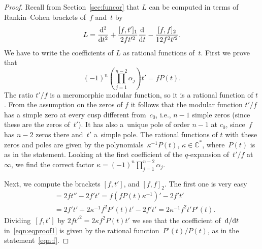 \documentclass[pdftex]{sigma}
\newcommand{\C}{\mathbb{C}}
\numberwithin{equation}{section}
\begin{document}
\begin{proof}Recall from Section~\ref{sec:funcor} that $L$ can be computed in terms of Rankin--Cohen brackets of~$f$ and~$t$ by
\begin{equation}\label{eqn:eqproof1}
L= \frac{{\rm d}^2}{{\rm d}t^2}+\frac{[f,t']_1}{2ft'^2}\frac{{\rm d}}{{\rm d}t}-\frac{[f,f]_2}{12f^2t'^2}.
\end{equation}
We have to write the coefficients of $L$ as rational functions of~$t$.
First we prove that
\[
(-1)^n\left(\prod_{j=1}^{n-2}{\alpha_j}\right)t'=fP(t).
\]
The ratio $t'/f$ is a meromorphic modular function, so it is a rational function of $t$. From the assumption on the zeros of $f$ it follows that the modular function $t'/f$ has a simple zero at every cusp different from~$c_0$, i.e., $n-1$ simple zeros (since these are the zeros of~$t'$). It has also a~unique pole of order $n-1$ at $c_0$, since~$f$ has $n-2$ zeros there and~$t'$ a~simple pole. The rational functions of $t$ with these zeros and poles are given by the polynomials~$\kappa^{-1}P(t)$, $\kappa\in \C^*$, where~$P(t)$ is as in the statement. Looking at the first coefficient of the $q$-expansion of~$t'/f$ at~$\infty$, we find the correct factor $\kappa=(-1)^{n}\prod_{j=1}^{n-2}{\alpha_j}$.

Next, we compute the brackets $[f,t']$, and $[f,f]_2$.
The first one is very easy
\begin{align*}
[f,t'] & =2ft''-2f't'=f(fP(t)\kappa^{-1})'-2f't' \\
& =2f't'+2\kappa^{-1} f^2P'(t)t'-2f't'=2\kappa^{-1} f^2t'P'(t).
\end{align*}
Dividing~$[f,t']$ by $2ft'^2=2\kappa f^2P(t)t'$ we see that the coefficient of~${\rm d}/{\rm d}t$ in~\eqref{eqn:eqproof1} is given by the rational function~$P'(t)/P(t)$, as in the statement~\eqref{eqn:f}.


\end{proof}
\end{document}
